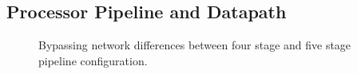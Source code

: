 
\subsection{Processor Pipeline and Datapath}\label{sec:processor}
\begin{figure}[b!]
\centering
{}
\hfil
{}
\caption{Bypassing network differences between four stage and five stage pipeline configuration.}
\label{fig:datapath_pipeline_conf}
\end{figure}

